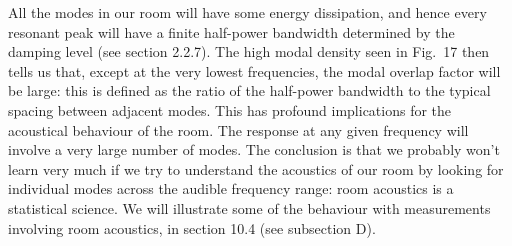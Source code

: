   All the modes in our room will have some energy dissipation, and hence every 
  resonant peak will have a finite half-power bandwidth determined by the 
  damping level (see section 2.2.7). The high modal density seen in Fig.\ 17 
  then tells us that, except at the very lowest frequencies, the modal overlap 
  factor will be large: this is defined as the ratio of the half-power 
  bandwidth to the typical spacing between adjacent modes. This has profound 
  implications for the acoustical behaviour of the room. The response at any 
  given frequency will involve a very large number of modes. The conclusion is 
  that we probably won't learn very much if we try to understand the acoustics 
  of our room by looking for individual modes across the audible frequency 
  range: room acoustics is a statistical science. We will illustrate some of 
  the behaviour with measurements involving room acoustics, in section 10.4 
  (see subsection D). 

